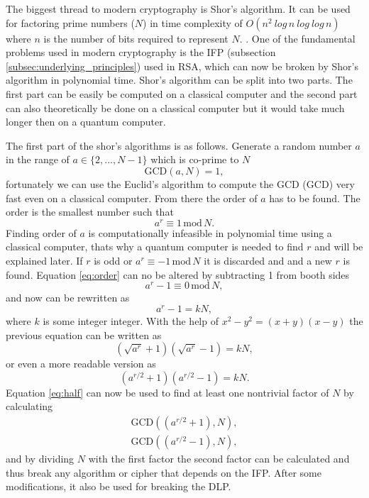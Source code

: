 The biggest thread to modern cryptography is Shor's algorithm. It can be used for factoring prime numbers ($N$) in time complexity of $O(n^2\ log\,n\ log\ log\,n)$ where $n$ is the number of bits required to represent $N$. \cite{Yanofsky2008}. One of the fundamental problems used in modern cryptography is the IFP (subsection \ref{subsec:underlying_principles}) used in RSA, which can now be broken by Shor’s algorithm in polynomial time. Shor's algorithm can be split into two parts. The first part can be easily be computed on a classical computer and the second part can also theoretically be done on a classical computer but it would take much longer then on a quantum computer.

The first part of the shor's algorithms is as follows. Generate a random number $a$ in the range of $a\in\{2,...,N-1\}$ which is co-prime to $N$
\begin{equation}
  \mathrm{GCD}(a, N) = 1,
\end{equation}
fortunately we can use the Euclid's algorithm to compute the GCD (\acl{GCD}) very fast even on a classical computer. From there the order of $a$ has to be found. The order is the smallest number such that
\begin{equation}
  \label{eq:order}
  a^r \equiv 1\,\mathrm{mod}\,N.
\end{equation}
Finding order of $a$ is computationally infeasible in polynomial time using a classical computer, thats why a quantum computer is needed to find $r$ and will be explained later. If $r$ is odd or $a^r\equiv-1\,\mathrm{mod}\,N$ it is discarded and and a new $r$ is found. Equation \ref{eq:order} can no be altered by subtracting 1 from booth sides
\begin{equation}
  a^r -1\equiv 0\,\mathrm{mod}\,N,
\end{equation}
and now can be rewritten as
\begin{equation}
  a^r -1=kN,
\end{equation}
where $k$ is some integer integer. With the help of $x^2 - y^2=(x+y)(x-y)$ the previous equation can be written as
\begin{equation}
  (\sqrt{a^r}+1)(\sqrt{a^r}-1)= kN,
\end{equation}
or even a more readable version as
\begin{equation}
  \label{eq:half}
  (a^{r/2}+1)(a^{r/2}-1)= kN.
\end{equation}
Equation \ref{eq:half} can now be used to find at least one nontrivial factor of $N$ by calculating
\begin{equation}
  \begin{aligned}
    \mathrm{GCD}((a^{r/2}+1), N), \\
    \mathrm{GCD}((a^{r/2}-1), N),
  \end{aligned}
\end{equation}
and by dividing $N$ with the first factor the second factor can be calculated and thus break any algorithm or cipher that depends on the IFP. After some modifications, it also be used for breaking the DLP. \cite{Yanofsky2008}\cite{Pittenger2000}

